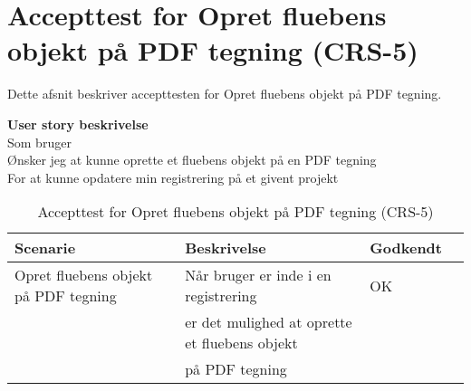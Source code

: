 \section{Accepttest for Opret fluebens objekt på PDF tegning (CRS-5)}
Dette afsnit beskriver accepttesten for Opret fluebens objekt på PDF tegning.

\textbf{User story beskrivelse} \\
Som bruger \\
Ønsker jeg at kunne oprette et fluebens objekt på en PDF tegning \\
For at kunne opdatere min registrering på et givent projekt

\begin{table}[H]
	\centering
	\begin{tabular}{|ll|l|ll|} \hline
		\textbf{Scenarie} &  & \textbf{Beskrivelse}&  \textbf{Godkendt}&  \\ \hline
		Opret fluebens objekt på PDF tegning&  &  Når bruger er inde i en registrering &  OK&  \\
		& & er det mulighed at oprette et fluebens objekt& & \\ 
		& & på PDF tegning& & \\ \hline
	\end{tabular}
	\caption{Accepttest for Opret fluebens objekt på PDF tegning (CRS-5)}
	\label{AcceptFlueben}
\end{table}
